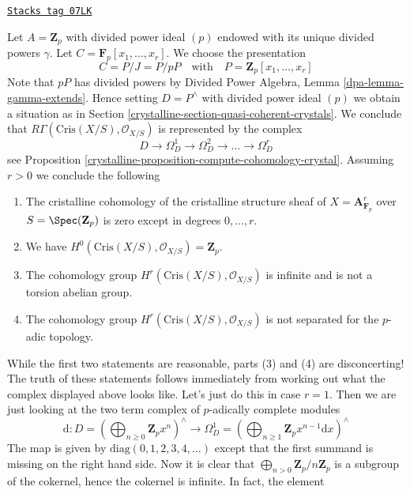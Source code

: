 \begin{example}
\label{crystalline-example-affine-n-space}
\href{https://stacks.math.columbia.edu/tag/07LK}{\texttt{Stacks tag 07LK}}

Let $A = \mathbf{Z}_p$ with divided power ideal $(p)$ endowed with
its unique divided powers $\gamma$. Let
$C = \mathbf{F}_p[x_1, \ldots, x_r]$. We choose the presentation
$$
C = P/J = P/pP\quad\text{with}\quad P = \mathbf{Z}_p[x_1, \ldots, x_r]
$$
Note that $pP$ has divided powers by
Divided Power Algebra, Lemma \ref{dpa-lemma-gamma-extends}.
Hence setting $D = P^\wedge$ with divided power ideal $(p)$ we obtain a
situation as in Section \ref{crystalline-section-quasi-coherent-crystals}.
We conclude that $R\Gamma(\text{Cris}(X/S), \mathcal{O}_{X/S})$
is represented by the complex
$$
D \to \Omega^1_D \to \Omega^2_D \to \ldots \to \Omega^r_D
$$
see Proposition \ref{crystalline-proposition-compute-cohomology-crystal}.
Assuming $r > 0$ we conclude the following
\begin{enumerate}
\item The cristalline cohomology of the cristalline structure sheaf
of $X = \mathbf{A}^r_{\mathbf{F}_p}$ over $S = \Spec(\mathbf{Z}_p)$
is zero except in degrees $0, \ldots, r$.
\item We have $H^0(\text{Cris}(X/S), \mathcal{O}_{X/S}) = \mathbf{Z}_p$.
\item The cohomology group $H^r(\text{Cris}(X/S), \mathcal{O}_{X/S})$
is infinite and is not a torsion abelian group.
\item The cohomology group $H^r(\text{Cris}(X/S), \mathcal{O}_{X/S})$
is not separated for the $p$-adic topology.
\end{enumerate}
While the first two statements are reasonable, parts (3) and (4) are
disconcerting! The truth of these statements follows immediately from
working out what the complex displayed above looks like. Let's just do
this in case $r = 1$. Then we are just looking at the two term complex
of $p$-adically complete modules
$$
\text{d} :
D = \left(
\bigoplus\nolimits_{n \geq 0} \mathbf{Z}_p x^n
\right)^\wedge
\longrightarrow
\Omega^1_D = \left(
\bigoplus\nolimits_{n \geq 1} \mathbf{Z}_p x^{n - 1}\text{d}x
\right)^\wedge
$$
The map is given by $\text{diag}(0, 1, 2, 3, 4, \ldots)$ except that
the first summand is missing on the right hand side. Now it is clear
that $\bigoplus_{n > 0} \mathbf{Z}_p/n\mathbf{Z}_p$ is a subgroup
of the cokernel, hence the cokernel is infinite. In fact, the element

\end{example}
